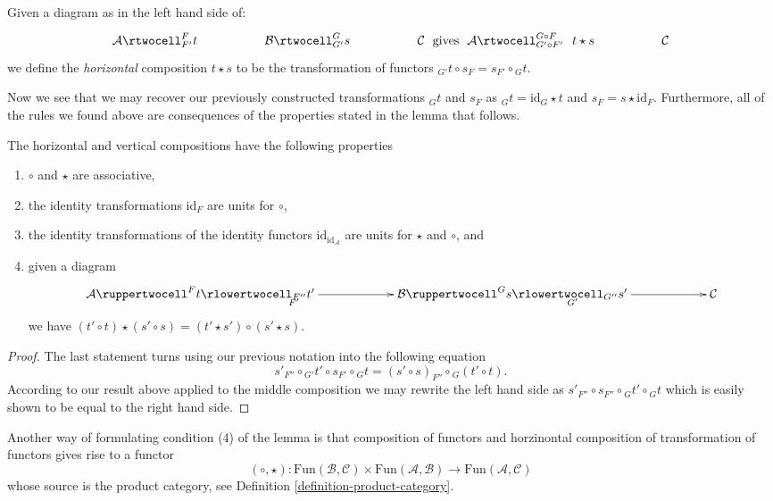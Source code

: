 \begin{definition}
\label{definition-horizontal-composition}
Given a diagram as in the left hand side of:
$$
\xymatrixcolsep{4pc}
\xymatrix{
\mathcal{A}
\rtwocell^F_{F'}{t}
&
\mathcal{B}
\rtwocell^G_{G'}{s}
&
\mathcal{C}
} 
\text{ gives }
\xymatrix{
\mathcal{A}
\rtwocell^{G \circ F} _{G' \circ F'}{\ \ t \star s}
&
\mathcal{C}
}
$$
we define the {\it horizontal} composition $t \star s$ to be the
transformation of functors ${}_{G'}t \circ s_F =  s_{F'}\circ {}_Gt$.
\end{definition}

\noindent
Now we see that we may recover our previously constructed
transformations ${}_Gt$ and $s_F$ as
$ {}_Gt = \text{id}_G \star t $ and $ s_F = s \star \text{id}_F $.
Furthermore, all of the rules we found above are consequences of
the properties stated in the lemma that follows.

\begin{lemma}
\label{lemma-properties-2-cat-cats}
The horizontal and vertical compositions have the following
properties
\begin{enumerate}
\item $\circ$ and $\star$ are associative,
\item the identity transformations $\text{id}_F$ 
are units for $\circ$,
\item the identity transformations of the identity functors
$\text{id}_{\text{id}_{\mathcal{A}}}$
are units for $\star$ and $\circ$, and
\item given a diagram
$$
\xymatrixcolsep{5pc}
\xymatrix{
\mathcal{A}
\ruppertwocell^F{t}
\ar[r]_(.3){F'}
\rlowertwocell_{F''}{t'}
&
\mathcal{B}
\ruppertwocell^G{s}
\ar[r]_(.3){G'}
\rlowertwocell_{G''}{s'}
&
\mathcal{C}
}
$$
we have $ (t' \circ t) \star (s' \circ s) = (t' \star s') \circ
(s' \star s)$.
\end{enumerate}
\end{lemma}

\begin{proof}
The last statement turns using our previous notation into the following
equation
$$
s'_{F''}
\circ
{}_{G'}t' 
\circ
s_{F'}
\circ
{}_Gt 
=
(s' \circ s)_{F''}
\circ
{}_G(t' \circ t).
$$
According to our result above applied to the middle composition
we may rewrite the left hand side as
$
s'_{F''}
\circ
s_{F''} 
\circ
{}_Gt'
\circ
{}_Gt 
$
which is easily shown to be equal to the right hand side.
\end{proof}

\noindent
Another way of formulating condition (4) of the lemma is
that composition of functors and horzinontal composition
of transformation of functors gives rise to a functor
$$
(\circ, \star) :
\text{Fun}(\mathcal{B}, \mathcal{C})
\times 
\text{Fun}(\mathcal{A}, \mathcal{B})
\longrightarrow
\text{Fun}(\mathcal{A}, \mathcal{C})
$$
whose source is the product category,
see Definition \ref{definition-product-category}.

